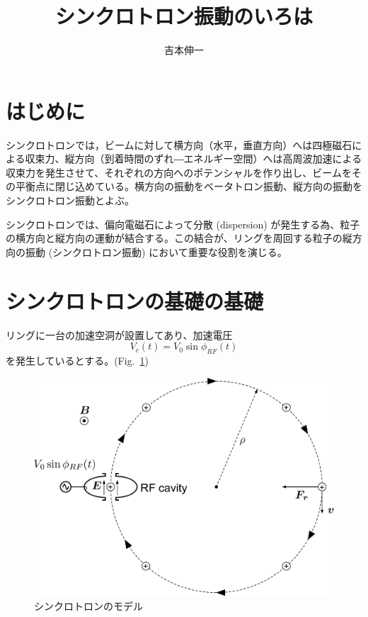 \documentclass[10pt,a4paper]{ltjsarticle}
\begin{document}
\title{シンクロトロン振動のいろは}
\author{吉本伸一}
\maketitle
\tableofcontents
\clearpage

\section{はじめに}
シンクロトロンでは，ビームに対して横方向（水平，垂直方向）へは四極磁石による収束力、縦方向（到着時間のずれ―エネルギー空間）へは高周波加速による収束力を発生させて、それぞれの方向へのポテンシャルを作り出し、ビームをその平衡点に閉じ込めている。横方向の振動をベータトロン振動、縦方向の振動をシンクロトロン振動とよぶ。

シンクロトロンでは、偏向電磁石によって分散 (dispersion) が発生する為、粒子の横方向と縦方向の運動が結合する。この結合が、リングを周回する粒子の縦方向の振動 (シンクロトロン振動) において重要な役割を演じる。


\section{シンクロトロンの基礎の基礎}
リングに一台の加速空洞が設置してあり、加速電圧
%
\begin{equation}
  V_c(t) = V_0 \sin \phi_{RF}(t)
\end{equation}
%
を発生しているとする。(Fig.~\ref{rf_circular})
%
\begin{figure}[hbt]
  \begin{center}
    \includegraphics[width=15cm,clip]{rf_circular.pdf}
    \caption{シンクロトロンのモデル}
   \label{rf_circular}
  \end{center}
\end{figure}
\end{document}
